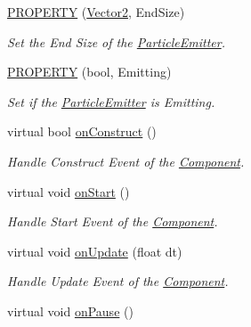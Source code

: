 \begin{DoxyCompactItemize}
\hyperlink{class_magnum_1_1_particle_emitter_ae2387ee1e94bef78db99c1ea5b5c17b0}{P\+R\+O\+P\+E\+R\+TY} (\hyperlink{class_magnum_1_1_vector2}{Vector2}, End\+Size)
\begin{DoxyCompactList}\small\item\em Set the End Size of the \hyperlink{class_magnum_1_1_particle_emitter}{Particle\+Emitter}. \end{DoxyCompactList}\item 
\hyperlink{class_magnum_1_1_particle_emitter_a520c252065573e4522dc04cb39e00c6b}{P\+R\+O\+P\+E\+R\+TY} (bool, Emitting)
\begin{DoxyCompactList}\small\item\em Set if the \hyperlink{class_magnum_1_1_particle_emitter}{Particle\+Emitter} is Emitting. \end{DoxyCompactList}\item 
virtual bool \hyperlink{class_magnum_1_1_particle_emitter_a4332986f229caea5ba4c5dfe29d97a93}{on\+Construct} ()
\begin{DoxyCompactList}\small\item\em Handle Construct Event of the \hyperlink{class_magnum_1_1_component}{Component}. \end{DoxyCompactList}\item 
virtual void \hyperlink{class_magnum_1_1_particle_emitter_a7befe16b4fce5462b47ffeb6d4b6b13a}{on\+Start} ()\hypertarget{class_magnum_1_1_particle_emitter_a7befe16b4fce5462b47ffeb6d4b6b13a}{}\label{class_magnum_1_1_particle_emitter_a7befe16b4fce5462b47ffeb6d4b6b13a}

\begin{DoxyCompactList}\small\item\em Handle Start Event of the \hyperlink{class_magnum_1_1_component}{Component}. \end{DoxyCompactList}\item 
virtual void \hyperlink{class_magnum_1_1_particle_emitter_a52ef385a6d4b1df98e92db676b6316ae}{on\+Update} (float dt)
\begin{DoxyCompactList}\small\item\em Handle Update Event of the \hyperlink{class_magnum_1_1_component}{Component}. \end{DoxyCompactList}\item 
virtual void \hyperlink{class_magnum_1_1_particle_emitter_a216658e7d1532d91c86d8f235524c44c}{on\+Pause} ()\hypertarget{class_magnum_1_1_particle_emitter_a216658e7d1532d91c86d8f235524c44c}{}\label{class_magnum_1_1_particle_emitter_a216658e7d1532d91c86d8f235524c44c}


\end{DoxyCompactItemize}
